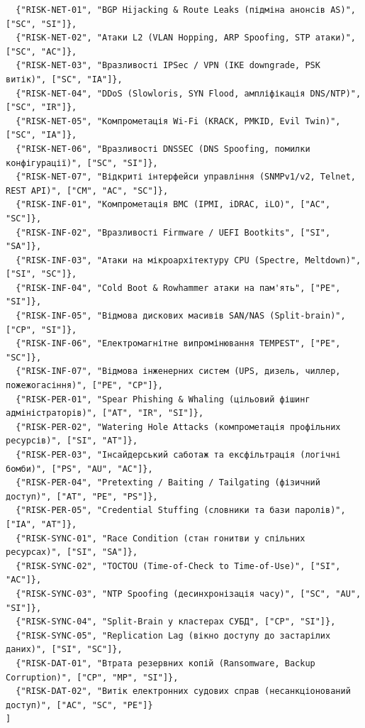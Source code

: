 \documentclass{article}
\begin{document}
{\begin{verbatim}
  {"RISK-NET-01", "BGP Hijacking & Route Leaks (підміна анонсів AS)", ["SC", "SI"]},
  {"RISK-NET-02", "Атаки L2 (VLAN Hopping, ARP Spoofing, STP атаки)", ["SC", "AC"]},
  {"RISK-NET-03", "Вразливості IPSec / VPN (IKE downgrade, PSK витік)", ["SC", "IA"]},
  {"RISK-NET-04", "DDoS (Slowloris, SYN Flood, ампліфікація DNS/NTP)", ["SC", "IR"]},
  {"RISK-NET-05", "Компрометація Wi-Fi (KRACK, PMKID, Evil Twin)", ["SC", "IA"]},
  {"RISK-NET-06", "Вразливості DNSSEC (DNS Spoofing, помилки конфігурації)", ["SC", "SI"]},
  {"RISK-NET-07", "Відкриті інтерфейси управління (SNMPv1/v2, Telnet, REST API)", ["CM", "AC", "SC"]},
  {"RISK-INF-01", "Компрометація BMC (IPMI, iDRAC, iLO)", ["AC", "SC"]},
  {"RISK-INF-02", "Вразливості Firmware / UEFI Bootkits", ["SI", "SA"]},
  {"RISK-INF-03", "Атаки на мікроархітектуру CPU (Spectre, Meltdown)", ["SI", "SC"]},
  {"RISK-INF-04", "Cold Boot & Rowhammer атаки на пам'ять", ["PE", "SI"]},
  {"RISK-INF-05", "Відмова дискових масивів SAN/NAS (Split-brain)", ["CP", "SI"]},
  {"RISK-INF-06", "Електромагнітне випромінювання TEMPEST", ["PE", "SC"]},
  {"RISK-INF-07", "Відмова інженерних систем (UPS, дизель, чиллер, пожежогасіння)", ["PE", "CP"]},
  {"RISK-PER-01", "Spear Phishing & Whaling (цільовий фішинг адміністраторів)", ["AT", "IR", "SI"]},
  {"RISK-PER-02", "Watering Hole Attacks (компрометація профільних ресурсів)", ["SI", "AT"]},
  {"RISK-PER-03", "Інсайдерський саботаж та ексфільтрація (логічні бомби)", ["PS", "AU", "AC"]},
  {"RISK-PER-04", "Pretexting / Baiting / Tailgating (фізичний доступ)", ["AT", "PE", "PS"]},
  {"RISK-PER-05", "Credential Stuffing (словники та бази паролів)", ["IA", "AT"]},
  {"RISK-SYNC-01", "Race Condition (стан гонитви у спільних ресурсах)", ["SI", "SA"]},
  {"RISK-SYNC-02", "TOCTOU (Time-of-Check to Time-of-Use)", ["SI", "AC"]},
  {"RISK-SYNC-03", "NTP Spoofing (десинхронізація часу)", ["SC", "AU", "SI"]},
  {"RISK-SYNC-04", "Split-Brain у кластерах СУБД", ["CP", "SI"]},
  {"RISK-SYNC-05", "Replication Lag (вікно доступу до застарілих даних)", ["SI", "SC"]},
  {"RISK-DAT-01", "Втрата резервних копій (Ransomware, Backup Corruption)", ["CP", "MP", "SI"]},
  {"RISK-DAT-02", "Витік електронних судових справ (несанкціонований доступ)", ["AC", "SC", "PE"]}
]
\end{verbatim}
}
\end{document}

